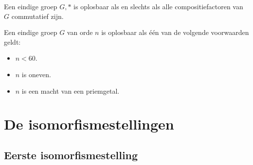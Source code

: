 \documentclass[main.tex]{subfiles}
\begin{document}
\begin{st}
  Een eindige groep $G,*$ is oplosbaar als en slechts als alle compositiefactoren van $G$ commutatief zijn.
  \zb
\end{st}

\begin{st}
  Een eindige groep $G$ van orde $n$ is oplosbaar als \'e\'en van de volgende voorwaarden geldt:
  \begin{itemize}
  \item $n < 60$.
  \item $n$ is oneven.
  \item $n$ is een macht van een priemgetal.
  \end{itemize}
  \zb 
\end{st}

\section{De isomorfismestellingen}
\label{sec:isomorfismestellingen}

\subsection{Eerste isomorfismestelling}
\end{document}

